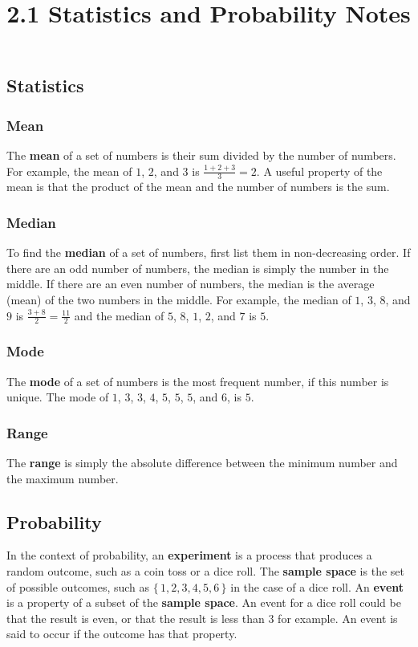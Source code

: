 \documentclass[twocolumn]{article}
\title{2.1 Statistics and Probability Notes}
\author{}
\date{}
\begin{document}
\maketitle

\subsection*{Statistics}
\subsubsection*{Mean}
The \textbf{mean} of a set of numbers is their sum divided by the number of
numbers. For example, the mean of $1$, $2$, and $3$ is $\frac{1 + 2 + 3}{3}
= 2$. A useful property of the mean is that the product of the mean and the
number of numbers is the sum.

\subsubsection*{Median}
To find the \textbf{median} of a set of numbers, first list them in
non-decreasing order. If there are an odd number of numbers, the median is
simply the number in the middle. If there are an even number of numbers, the
median is the average (mean) of the two numbers in the middle. For example,
the median of $1$, $3$, $8$, and $9$ is $\frac{3 + 8}{2} = \frac{11}{2}$ and
the median of $5$, $8$, $1$, $2$, and $7$ is $5$.

\subsubsection*{Mode}
The \textbf{mode} of a set of numbers is the most frequent number, if this
number is unique. The mode of $1$, $3$, $3$, $4$, $5$, $5$, $5$, and $6$, is
$5$.

\subsubsection*{Range}
The \textbf{range} is simply the absolute difference between the minimum
number and the maximum number.

\subsection*{Probability}
In the context of probability, an \textbf{experiment} is a process that
produces a random outcome, such as a coin toss or a dice roll. The
\textbf{sample space} is the set of possible outcomes, such as $\{\, 1, 2,
3, 4, 5, 6 \,\}$ in the case of a dice roll. An \textbf{event} is a property
of a subset of the \textbf{sample space}. An event for a dice roll could be
that the result is even, or that the result is less than $3$ for example. An
event is said to occur if the outcome has that property.
\end{document}
